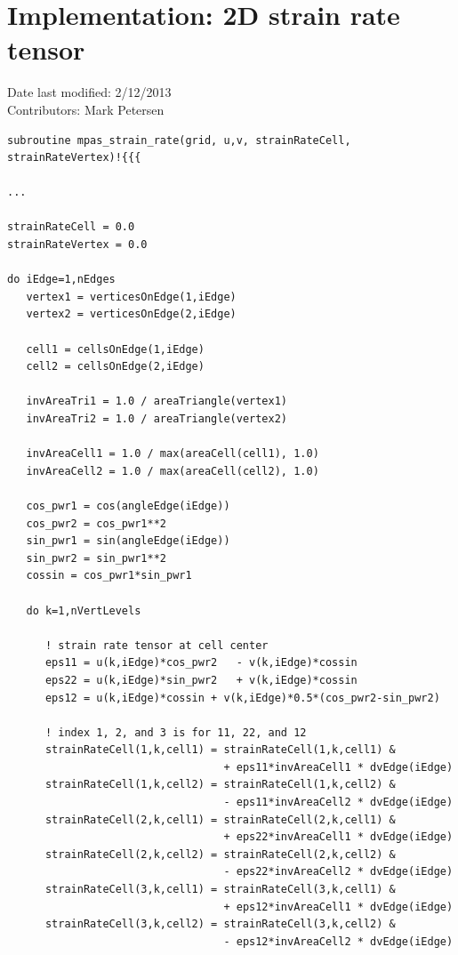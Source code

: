 \documentclass[11pt]{report}
\begin{document}
\section{Implementation: 2D strain rate tensor}
Date last modified: 2/12/2013 \\
Contributors: Mark Petersen \\


\begin{verbatim}
subroutine mpas_strain_rate(grid, u,v, strainRateCell, strainRateVertex)!{{{

...

strainRateCell = 0.0
strainRateVertex = 0.0

do iEdge=1,nEdges
   vertex1 = verticesOnEdge(1,iEdge)
   vertex2 = verticesOnEdge(2,iEdge)

   cell1 = cellsOnEdge(1,iEdge)
   cell2 = cellsOnEdge(2,iEdge)

   invAreaTri1 = 1.0 / areaTriangle(vertex1)
   invAreaTri2 = 1.0 / areaTriangle(vertex2)

   invAreaCell1 = 1.0 / max(areaCell(cell1), 1.0)
   invAreaCell2 = 1.0 / max(areaCell(cell2), 1.0)

   cos_pwr1 = cos(angleEdge(iEdge))
   cos_pwr2 = cos_pwr1**2
   sin_pwr1 = sin(angleEdge(iEdge))
   sin_pwr2 = sin_pwr1**2
   cossin = cos_pwr1*sin_pwr1

   do k=1,nVertLevels

      ! strain rate tensor at cell center
      eps11 = u(k,iEdge)*cos_pwr2   - v(k,iEdge)*cossin
      eps22 = u(k,iEdge)*sin_pwr2   + v(k,iEdge)*cossin
      eps12 = u(k,iEdge)*cossin + v(k,iEdge)*0.5*(cos_pwr2-sin_pwr2)

      ! index 1, 2, and 3 is for 11, 22, and 12 
      strainRateCell(1,k,cell1) = strainRateCell(1,k,cell1) &
                                  + eps11*invAreaCell1 * dvEdge(iEdge)
      strainRateCell(1,k,cell2) = strainRateCell(1,k,cell2) &
                                  - eps11*invAreaCell2 * dvEdge(iEdge)
      strainRateCell(2,k,cell1) = strainRateCell(2,k,cell1) &
                                  + eps22*invAreaCell1 * dvEdge(iEdge)
      strainRateCell(2,k,cell2) = strainRateCell(2,k,cell2) &
                                  - eps22*invAreaCell2 * dvEdge(iEdge)
      strainRateCell(3,k,cell1) = strainRateCell(3,k,cell1) &
                                  + eps12*invAreaCell1 * dvEdge(iEdge)
      strainRateCell(3,k,cell2) = strainRateCell(3,k,cell2) &
                                  - eps12*invAreaCell2 * dvEdge(iEdge)


\end{verbatim}
\end{document}
